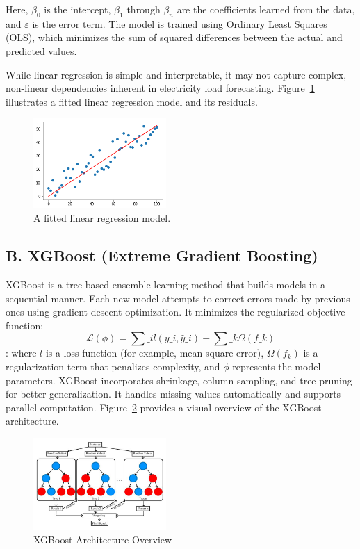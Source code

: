 \documentclass[final,numbered]{ifacconf}
\begin{document}
Here, $\beta_0$ is the intercept, $\beta_1$ through $\beta_n$ are the coefficients learned from the data, and $\varepsilon$ is the error term. The model is trained using Ordinary Least Squares (OLS), which minimizes the sum of squared differences between the actual and predicted values. 

While linear regression is simple and interpretable, it may not capture complex, non-linear dependencies inherent in electricity load forecasting. Figure~\ref{fig:linear} illustrates a fitted linear regression model and its residuals.

\begin{figure}[h]
\centering
\includegraphics[width=0.45\textwidth]{linearregression.png}
\caption{A fitted linear regression model.}
\label{fig:linear}

\end{figure}

\subsection{B. XGBoost (Extreme Gradient Boosting)}
XGBoost is a tree-based ensemble learning method that builds models in a sequential manner. Each new model attempts to correct errors made by previous ones using gradient descent optimization. It minimizes the regularized objective function\cite{chen2016xgboost}:
\begin{equation}
\mathcal{L}(\phi) = \sum\_{i} l(y\_i, \hat{y}\_i) + \sum\_k \Omega(f\_k)
\end{equation}
\cite{chen2016xgboost}:
where $l$ is a loss function (for example, mean square error), $\Omega(f_k)$ is a regularization term that penalizes complexity, and $\phi$ represents the model parameters. XGBoost incorporates shrinkage, column sampling, and tree pruning for better generalization. It handles missing values automatically and supports parallel computation. Figure~\ref{fig:xgboost} provides a visual overview of the XGBoost architecture.

\begin{figure}[h]
  \centering
  \includegraphics[width=0.45\textwidth]{xgboost.png}
  \caption{XGBoost Architecture Overview \cite{Oztornaci2025}}
  \label{fig:xgboost}
\end{figure}
\end{document}
